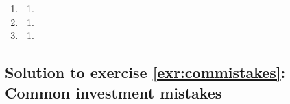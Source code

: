 \documentclass[
  12pt,
  oneside]{book}
\providecommand{\tightlist}{%
  \setlength{\itemsep}{0pt}\setlength{\parskip}{0pt}}
\theoremstyle{definition}
\theoremstyle{definition}
\theoremstyle{definition}
\theoremstyle{definition}
\theoremstyle{remark}
\begin{document}
\begin{enumerate}
\def\labelenumi{\arabic{enumi}.}
\tightlist
\item
  \begin{enumerate}
  \def\labelenumii{\alph{enumii})}
  \tightlist
  \item
  \end{enumerate}
\item
  \begin{enumerate}
  \def\labelenumii{\alph{enumii})}
  \setcounter{enumii}{2}
  \tightlist
  \item
  \end{enumerate}
\item
  \begin{enumerate}
  \def\labelenumii{\alph{enumii})}
  \setcounter{enumii}{1}
  \tightlist
  \item
  \end{enumerate}
\end{enumerate}

\subsection*{Solution to exercise \ref{exr:commistakes}: Common investment mistakes}\label{sol:commistakes}
\end{document}
